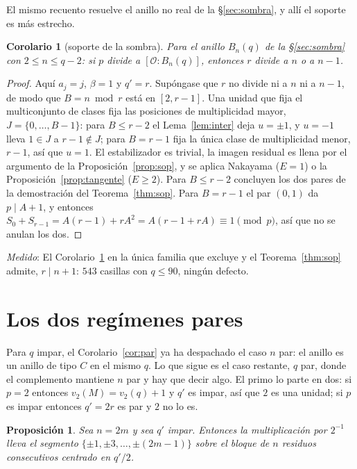 \documentclass[11pt,a4paper]{article}
\newtheorem{proposition}[theorem]{Proposici\'on}
\newtheorem{corollary}[theorem]{Corolario}
\theoremstyle{definition}
\newcommand{\cO}{\mathcal{O}}
\newcommand{\medido}[1]{\emph{Medido}: #1}
\begin{document}
El mismo recuento resuelve el anillo no real de la \S\ref{sec:sombra}, y all\'i el soporte es m\'as
estrecho.

\begin{corollary}[soporte de la sombra]\label{cor:sopsombra}
Para el anillo $B_n(q)$ de la \S\ref{sec:sombra} con $2\le n\le q-2$: si $p$ divide a
$[\cO:B_n(q)]$, entonces $r$ divide a $n$ o a $n-1$.
\end{corollary}

\begin{proof}
Aqu\'i $a_j=j$, $\beta=1$ y $q'=r$. Sup\'ongase que $r$ no divide ni a $n$ ni a $n-1$, de modo que
$B=n\bmod r$ est\'a en $[2,r-1]$. Una unidad que fija el multiconjunto de clases fija las posiciones
de multiplicidad mayor, $J=\{0,\dots,B-1\}$: para $B\le r-2$ el Lema~\ref{lem:inter} deja $u=\pm1$,
y $u=-1$ lleva $1\in J$ a $r-1\notin J$; para $B=r-1$ fija la \'unica clase de multiplicidad menor,
$r-1$, as\'i que $u=1$. El estabilizador es trivial, la imagen residual es llena por el argumento de
la Proposici\'on~\ref{prop:sop}, y se aplica Nakayama ($E=1$) o la Proposici\'on~\ref{prop:tangente}
($E\ge2$). Para $B\le r-2$ concluyen los dos pares de la demostraci\'on del Teorema~\ref{thm:sop}.
Para $B=r-1$ el par $(0,1)$ da $p\mid A+1$, y entonces
$S_0+S_{r-1}=A(r-1)+rA^2=A(r-1+rA)\equiv1\pmod p$, as\'i que no se anulan los dos.
\end{proof}

\medido{El Corolario~\ref{cor:sopsombra} en la \'unica familia que excluye y el
Teorema~\ref{thm:sop} admite, $r\mid n+1$: $543$ casillas con $q\le90$, ning\'un defecto.}

\section{Los dos reg\'imenes pares}\label{sec:par}

Para $q$ impar, el Corolario~\ref{cor:par} ya ha despachado el caso $n$ par: el anillo es un anillo
de tipo $C$ en el mismo $q$. Lo que sigue es el caso restante, $q$ par, donde el complemento
mantiene $n$ par y hay que decir algo. El primo lo parte en dos: si $p=2$ entonces $v_2(M)=v_2(q)+1$
y $q'$ es impar, as\'i que $2$ es una unidad; si $p$ es impar entonces $q'=2r$ es par y $2$ no lo
es.

\begin{proposition}\label{prop:par2}
Sea $n=2m$ y sea $q'$ impar. Entonces la multiplicaci\'on por $2^{-1}$ lleva el segmento
$\{\pm1,\pm3,\dots,\pm(2m-1)\}$ sobre el bloque de $n$ residuos consecutivos centrado en $q'/2$.
\end{proposition}
\end{document}
